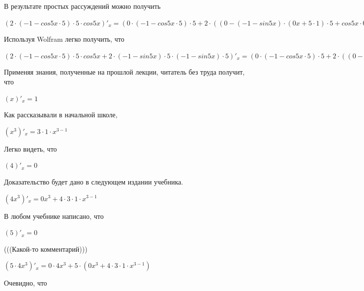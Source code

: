 \documentclass[12pt,a4paper,fleqn]{article}
\theoremstyle{definition}
\begin{document}
В результате простых рассуждений можно получить 

$( 2  \cdot ( -1  - cos 5  x  \cdot  5 ) \cdot  5  \cdot cos 5  x )'_{x} = ( 0  \cdot ( -1  - cos 5  x  \cdot  5 ) \cdot  5  +  2  \cdot (( 0  - ( -1  - sin 5  x ) \cdot ( 0  x  +  5  \cdot  1 ) \cdot  5  + cos 5  x  \cdot  0 ) \cdot  5  + ( -1  - cos 5  x  \cdot  5 ) \cdot  0 )) \cdot cos 5  x  +  2  \cdot ( -1  - cos 5  x  \cdot  5 ) \cdot  5  \cdot ( -1  - sin 5  x ) \cdot ( 0  x  +  5  \cdot  1 )$

Используя Wolfram легко получить, что 

$( 2  \cdot ( -1  - cos 5  x  \cdot  5 ) \cdot  5  \cdot cos 5  x  +  2  \cdot ( -1  - sin 5  x ) \cdot  5  \cdot ( -1  - sin 5  x ) \cdot  5 )'_{x} = ( 0  \cdot ( -1  - cos 5  x  \cdot  5 ) \cdot  5  +  2  \cdot (( 0  - ( -1  - sin 5  x ) \cdot ( 0  x  +  5  \cdot  1 ) \cdot  5  + cos 5  x  \cdot  0 ) \cdot  5  + ( -1  - cos 5  x  \cdot  5 ) \cdot  0 )) \cdot cos 5  x  +  2  \cdot ( -1  - cos 5  x  \cdot  5 ) \cdot  5  \cdot ( -1  - sin 5  x ) \cdot ( 0  x  +  5  \cdot  1 ) + ( 0  \cdot ( -1  - sin 5  x ) \cdot  5  +  2  \cdot (( 0  - cos 5  x  \cdot ( 0  x  +  5  \cdot  1 )) \cdot  5  + ( -1  - sin 5  x ) \cdot  0 )) \cdot ( -1  - sin 5  x ) \cdot  5  +  2  \cdot ( -1  - sin 5  x ) \cdot  5  \cdot (( 0  - cos 5  x  \cdot ( 0  x  +  5  \cdot  1 )) \cdot  5  + ( -1  - sin 5  x ) \cdot  0 )$

Применяя знания, полученные на прошлой лекции, читатель без труда получит, что 

$( x )'_{x} =  1 $

Как рассказывали в начальной школе, 

$({ x }^{ 3 })'_{x} =  3  \cdot  1  \cdot { x }^{ 3  -  1 }$

Легко видеть, что 

$( 4 )'_{x} =  0 $

Доказательство будет дано в следующем издании учебника. 

$( 4 { x }^{ 3 })'_{x} =  0 { x }^{ 3 } +  4  \cdot  3  \cdot  1  \cdot { x }^{ 3  -  1 }$

В любом учебнике написано, что 

$( 5 )'_{x} =  0 $

(((Какой-то комментарий))) 

$( 5  \cdot  4 { x }^{ 3 })'_{x} =  0  \cdot  4 { x }^{ 3 } +  5  \cdot ( 0 { x }^{ 3 } +  4  \cdot  3  \cdot  1  \cdot { x }^{ 3  -  1 })$

Очевидно, что 
\end{document}
